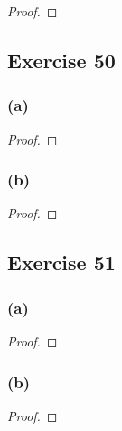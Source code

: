 \documentclass[14pt]{extarticle}
\begin{document}
\begin{proof}

\end{proof}

\subsection{Exercise 50}

\subsubsection{(a)}

\begin{proof}

\end{proof}

\subsubsection{(b)}

\begin{proof}

\end{proof}

\subsection{Exercise 51}

\subsubsection{(a)}

\begin{proof}

\end{proof}

\subsubsection{(b)}

\begin{proof}

\end{proof}
\end{document}
